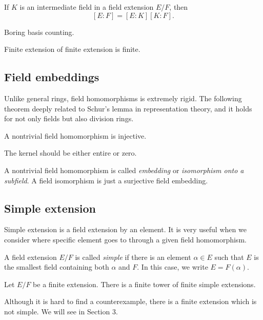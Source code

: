 \documentclass{../exp}
\begin{document}
\begin{thm}
If $K$ is an intermediate field in a field extension $E/F$, then
\[[E:F]=[E:K][K:F].\]
\end{thm}
\begin{pf}
Boring basis counting.
\end{pf}

\begin{cor}
Finite extension of finite extension is finite.
\end{cor}




\subsection{Field embeddings}

Unlike general rings, field homomorphisms is extremely rigid.
The following theorem deeply related to Schur's lemma in representation theory, and it holds for not only fields but also division rings.

\begin{prop}
A nontrivial field homomorphism is injective.
\end{prop}
\begin{pf}
The kernel should be either entire or zero.
\end{pf}
A nontrivial field homomorphism is called \emph{embedding} or \emph{isomorphism onto a subfield}.
A field isomorphism is just a surjective field embedding.



\subsection{Simple extension}
Simple extension is a field extension by an element.
It is very useful when we consider where specific element goes to through a given field homomorphism.

\begin{defn}
A field extension $E/F$ is called \emph{simple} if there is an element $\alpha\in E$ such that $E$ is the smallest field containing both $\alpha$ and $F$.
In this case, we write $E=F(\alpha)$.
\end{defn}

\begin{lem}
Let $E/F$ be a finite extension.
There is a finite tower of finite simple extensions.
\end{lem}

Although it is hard to find a counterexample, there is a finite extension which is not simple.
We will see in Section 3.
\end{document}
